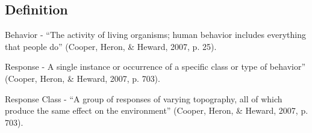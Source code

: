 \subsection{Definition}  
Behavior - ``The activity of living organisms; human behavior includes everything that people do'' (Cooper, Heron, \& Heward, 2007, p. 25).

Response - A single instance or occurrence of a specific class or type of behavior'' (Cooper, Heron, \& Heward, 2007, p. 703).  

Response Class - ``A group of responses of varying topography, all of which produce the same effect on the environment'' (Cooper, Heron, \& Heward, 2007, p. 703).  
%
